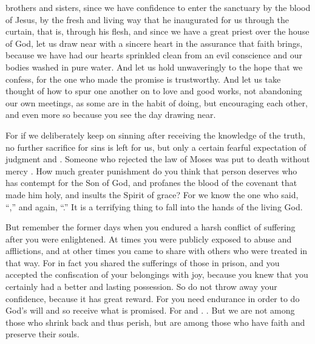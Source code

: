 {brothers and sisters,
since we have
confidence
to
enter
the sanctuary
by
the blood
of Jesus,
by the fresh
and
living
way
that
he inaugurated
for us
through
the curtain,
that
is,
through his
flesh,
and
since we have a great
priest
over
the house
of God,
let us draw near
with
a sincere
heart
in
the assurance
that faith
brings, because we have had our hearts
sprinkled clean
from
an evil
conscience
and
our bodies
washed
in pure
water.
And let us hold
unwaveringly
to the hope
that we confess,
for
the one who made the promise
is trustworthy.
And
let us take thought
of how to spur
one another
on to
love
and
good
works,
not
abandoning
our own
meetings,
as
some
are in the habit
of doing, but
encouraging
each other, and
even
more
so because you see
the day
drawing near.
\par }{\PP {}For
if we deliberately
keep on sinning
after
receiving
the knowledge
of the truth,
no further
sacrifice
for
sins
is left
for us,
but
only a certain
fearful
expectation
of judgment
and
{}
{}.
Someone
who rejected
the law
of Moses
was put to death
without
mercy
{}.
How much
greater
punishment
do you think
that person deserves
who has contempt
for the Son
of God,
and
profanes
the blood
of the covenant
that made
him holy,
and
insults
the Spirit
of grace?
For
we know
the one who said, “{},” and
again, “{}.”
It is a terrifying
thing to fall
into
the hands
of the living
God.
\par }{\PP {}But
remember
the former
days
when you endured
a harsh
conflict
of suffering
after
you were enlightened.
At times you were publicly exposed
to abuse and
afflictions,
and at other times you came
to share
with others who were treated
in that way.
For
in fact you shared the sufferings
of those in prison,
and
you accepted
the confiscation
of your
belongings
with
joy,
because you knew
that you
certainly had
a better
and
lasting
possession.
So
do
not
throw away
your
confidence,
because it has
great
reward.
For
you need
endurance
in order
to do
God’s
will
and so receive
what is promised.
For
{}
and
{}.
.
But
we
are
not
among those who shrink back
and thus
perish,
but
are among those who have faith
and preserve
their souls.

}
